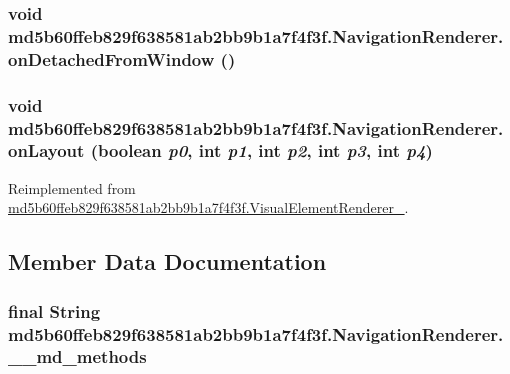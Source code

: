 \hypertarget{classmd5b60ffeb829f638581ab2bb9b1a7f4f3f_1_1_navigation_renderer_c900a338e48e325dcc118a47937429c9}{
\subsubsection[{onDetachedFromWindow}]{\setlength{\rightskip}{0pt plus 5cm}void md5b60ffeb829f638581ab2bb9b1a7f4f3f.NavigationRenderer.onDetachedFromWindow ()}}
\label{classmd5b60ffeb829f638581ab2bb9b1a7f4f3f_1_1_navigation_renderer_c900a338e48e325dcc118a47937429c9}


\hypertarget{classmd5b60ffeb829f638581ab2bb9b1a7f4f3f_1_1_navigation_renderer_7a117ff161f3a6f2d44642c32fba1306}{
\subsubsection[{onLayout}]{\setlength{\rightskip}{0pt plus 5cm}void md5b60ffeb829f638581ab2bb9b1a7f4f3f.NavigationRenderer.onLayout (boolean {\em p0}, \/  int {\em p1}, \/  int {\em p2}, \/  int {\em p3}, \/  int {\em p4})}}
\label{classmd5b60ffeb829f638581ab2bb9b1a7f4f3f_1_1_navigation_renderer_7a117ff161f3a6f2d44642c32fba1306}




Reimplemented from \hyperlink{classmd5b60ffeb829f638581ab2bb9b1a7f4f3f_1_1_visual_element_renderer__1_8c7af843aeec04827cb3a3981ea1978d}{md5b60ffeb829f638581ab2bb9b1a7f4f3f.VisualElementRenderer\_}.

\subsection{Member Data Documentation}
\hypertarget{classmd5b60ffeb829f638581ab2bb9b1a7f4f3f_1_1_navigation_renderer_6f16e4bf9cbed6430832e41a4d1bd118}{
\subsubsection[{\_\-\_\-md\_\-methods}]{\setlength{\rightskip}{0pt plus 5cm}final String {\bf md5b60ffeb829f638581ab2bb9b1a7f4f3f.NavigationRenderer.\_\-\_\-md\_\-methods}}}
\label{classmd5b60ffeb829f638581ab2bb9b1a7f4f3f_1_1_navigation_renderer_6f16e4bf9cbed6430832e41a4d1bd118}




